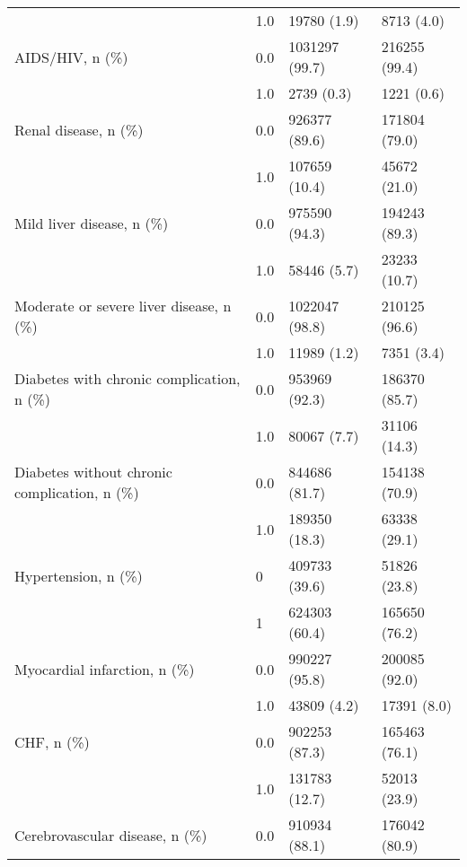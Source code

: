 \begin{tabular}{llll}
                           & 1.0 &                    19780 (1.9) &         8713 (4.0) \\
AIDS/HIV, n (\%) & 0.0 &                 1031297 (99.7) &      216255 (99.4) \\
                           & 1.0 &                     2739 (0.3) &         1221 (0.6) \\
Renal disease, n (\%) & 0.0 &                  926377 (89.6) &      171804 (79.0) \\
                           & 1.0 &                  107659 (10.4) &       45672 (21.0) \\
Mild liver disease, n (\%) & 0.0 &                  975590 (94.3) &      194243 (89.3) \\
                           & 1.0 &                    58446 (5.7) &       23233 (10.7) \\
Moderate or severe liver disease, n (\%) & 0.0 &                 1022047 (98.8) &      210125 (96.6) \\
                           & 1.0 &                    11989 (1.2) &         7351 (3.4) \\
Diabetes with chronic complication, n (\%) & 0.0 &                  953969 (92.3) &      186370 (85.7) \\
                           & 1.0 &                    80067 (7.7) &       31106 (14.3) \\
Diabetes without chronic complication, n (\%) & 0.0 &                  844686 (81.7) &      154138 (70.9) \\
                           & 1.0 &                  189350 (18.3) &       63338 (29.1) \\
Hypertension, n (\%) & 0 &                  409733 (39.6) &       51826 (23.8) \\
                           & 1 &                  624303 (60.4) &      165650 (76.2) \\
Myocardial infarction, n (\%) & 0.0 &                  990227 (95.8) &      200085 (92.0) \\
                           & 1.0 &                    43809 (4.2) &        17391 (8.0) \\
CHF, n (\%) & 0.0 &                  902253 (87.3) &      165463 (76.1) \\
                           & 1.0 &                  131783 (12.7) &       52013 (23.9) \\
Cerebrovascular disease, n (\%) & 0.0 &                  910934 (88.1) &      176042 (80.9) \\

\end{tabular}
